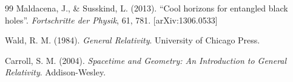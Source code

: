 \documentclass[12pt,a4paper]{book}
\begin{document}
\begin{thebibliography}{99}
 Maldacena, J., \& Susskind, L. (2013). ``Cool horizons for entangled black holes''. \textit{Fortschritte der Physik}, 61, 781. [arXiv:1306.0533]

 Wald, R. M. (1984). \textit{General Relativity}. University of Chicago Press.

 Carroll, S. M. (2004). \textit{Spacetime and Geometry: An Introduction to General Relativity}. Addison-Wesley.

\end{thebibliography}
\end{document}
